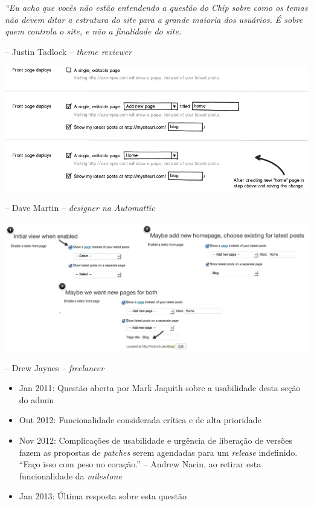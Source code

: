 \documentclass{beamer}
\begin{document}
\begin{frame}
\begin{center}
  \emph{``Eu acho que vocês não estão entendendo a questão do Chip sobre como
  os temas não devem ditar a estrutura do site para a grande maioria dos
  usuários. É sobre quem controla o site, e não a finalidade do site.}
\end{center}
\footnotesize{-- Justin Tadlock -- \emph{theme reviewer}}
\end{frame}

\begin{frame}
\begin{center}
  \includegraphics[height=0.6\textheight]{./img/proposal-dave-martin.png}
\end{center}
\footnotesize{-- Dave Martin -- \emph{designer na Automattic}}
\end{frame}

\begin{frame}
\begin{center}
  \includegraphics[width=\textwidth]{./img/proposal-drew-jaynes.png}
\end{center}
\footnotesize{-- Drew Jaynes -- \emph{freelancer}}
\end{frame}

\begin{frame}
\begin{itemize}
  \pause \item Jan 2011: Questão aberta por Mark Jaquith sobre a usabilidade
    desta seção do admin
  \pause \item Out 2012: Funcionalidade considerada crítica e de alta
    prioridade
  \pause \item Nov 2012: Complicações de usabilidade e urgência de liberação de
    versões fazem as propostas de \emph{patches} serem agendadas para um
    \emph{release} indefinido. ``Faço isso com peso no coração.'' -- Andrew
    Nacin, ao retirar esta funcionalidade da \emph{milestone}
  \pause \item Jan 2013: Última resposta sobre esta questão
\end{itemize}
\end{frame}
\end{document}
